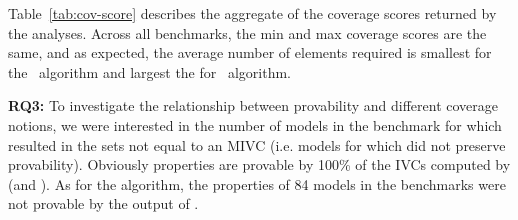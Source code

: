 

Table~\ref{tab:cov-score} describes the aggregate of the coverage scores returned by the analyses.  Across all benchmarks, the min and max coverage scores are the same, and as expected, the average number of elements required is smallest for the \mustalg\ algorithm and largest the for \ucalg\ algorithm.



\textbf{RQ3:}
To investigate the relationship between provability and different coverage notions,
we were interested in the number of models in the benchmark for which
\mustalg resulted in the sets not equal to an MIVC (i.e. models for which
\mustalg did not preserve provability).
Obviously properties are provable by 100\% of the IVCs computed by \ucalg (and \ucbfalg).
As for the \mustalg algorithm, the properties of 84 models in the benchmarks were not provable by the output of \mustalg.
\vspace{-0.1in}